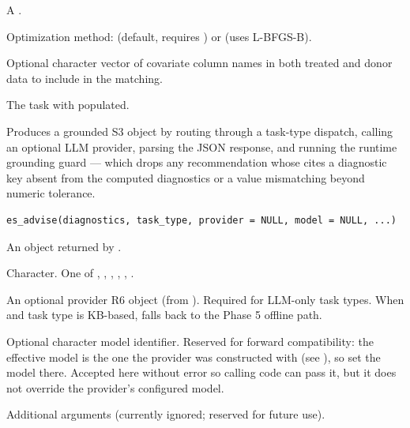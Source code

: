 \documentclass[a4paper]{book}
\begin{document}
%
\begin{Arguments}
\begin{ldescription}
\item[\code{task}] A .

\item[\code{method}] Optimization method:  (default, requires
) or  (uses  L-BFGS-B).

\item[\code{covariates}] Optional character vector of covariate column names
in both treated and donor data to include in the matching.
\end{ldescription}
\end{Arguments}
%
\begin{Value}
The task with  populated.
\end{Value}
%
\begin{Description}
Produces a grounded  S3 object by routing through a task-type
dispatch, calling an optional LLM provider, parsing the JSON response, and
running the runtime grounding guard — which drops any recommendation whose
 cites a diagnostic key absent from the computed diagnostics
or a value mismatching beyond numeric tolerance.
\end{Description}
%
\begin{Usage}
\begin{verbatim}
es_advise(diagnostics, task_type, provider = NULL, model = NULL, ...)
\end{verbatim}
\end{Usage}
%
\begin{Arguments}
\begin{ldescription}
\item[\code{diagnostics}] An  object returned by
.

\item[\code{task\_type}] Character. One of , ,
, , ,
.

\item[\code{provider}] An optional provider R6 object (from ).
Required for LLM-only task types. When  and task type is KB-based,
falls back to the Phase 5 offline path.

\item[\code{model}] Optional character model identifier. Reserved for forward
compatibility: the effective model is the one the provider was constructed
with (see ), so set the model there. Accepted here
without error so calling code can pass it, but it does not override the
provider's configured model.

\item[\code{...}] Additional arguments (currently ignored; reserved for future use).
\end{ldescription}
\end{Arguments}
\end{document}
